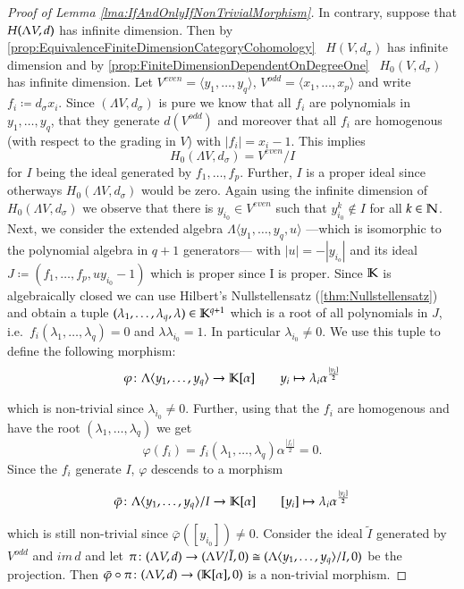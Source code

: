 \begin{proof}[Proof of Lemma \ref{lma:IfAndOnlyIfNonTrivialMorphism}]
  In contrary, suppose that $H(\Lambda V,d)$ has infinite dimension. Then by \ref{prop:EquivalenceFiniteDimensionCategoryCohomology}
  ~$H(V, d_{\sigma})$ has infinite dimension and by \ref{prop:FiniteDimensionDependentOnDegreeOne} ~$H_0(V, d_{\sigma})$ has
  infinite dimension. Let ${V^{even} = \langle y_1, \ldots , y_q \rangle}$,
  ${V^{odd} = \langle x_1 , \ldots , x_p \rangle}$ and write
  $f_i \coloneqq d_{\sigma} x_i$. Since $(\Lambda V, d_{\sigma})$ is pure we know that all $f_i$ are 
  polynomials in $y_1, \ldots , y_q$, that they generate $d(V^{odd})$ and moreover that all $f_i$ are homogenous (with
  respect to the grading in $V$)
  with $|f_i| = x_i -1$. This implies 
  $$H_0(\Lambda V,d_{\sigma}) = V^{even} / I$$
  for $I$ being the ideal generated by $f_1, \ldots, f_p$. Further, $I$  is a proper ideal since otherways
  $H_0(\Lambda V,d_{\sigma})$ would be zero. Again using the infinite dimension of 
  $H_0(\Lambda V,d_{\sigma})$ we observe that there is $y_{i_0} \in V^{even}$  such that
  $y_{i_0}^k \notin I$ for all $k \in \mathbb{N}$. Next, we consider the extended algebra 
  $\Lambda \langle y_1, \ldots, y_q, u \rangle$ ---which is isomorphic to the polynomial algebra in $q+1$ generators---
  with $|u| = - |y_{i_o}|$ and its ideal 
  $J \coloneqq (f_1, \ldots, f_p, u y_{i_0} - 1)$ which is proper since I is proper.
  Since $\mathbb{K}$ is algebraically closed we can use Hilbert's Nullstellensatz (\ref{thm:Nullstellensatz}) and obtain a tuple 
  $(\lambda_1, \ldots, \lambda_q, \lambda) \in \mathbb{K}^{q+1}$ which is a root of all polynomials in $J$,
  i.e.\ $f_i(\lambda_1, \ldots, \lambda_q) = 0$ and $\lambda \lambda_{i_0} = 1$. In particular 
  $\lambda_{i_0} \neq 0$. We use this tuple to define the following morphism:
  $$ \varphi \colon  \Lambda \langle y_1, \ldots, y_q \rangle \to \mathbb{K}[\alpha]
  \qquad y_i \mapsto \lambda_i \alpha^{\frac{|y_i]}{2}}$$
  
  which is non-trivial since $\lambda_{i_0} \neq 0$. Further, using that the $f_i$ are homogenous 
  and have the root $(\lambda_1, \ldots , \lambda_q)$ we get 
  $$\varphi(f_i) = f_i(\lambda_1, \ldots , \lambda_q) \alpha^{\frac{|f_i|}{2}} = 0. $$
  Since the $f_i$ generate $I$,  $\varphi$ descends to a morphism
  
  $$ \bar{\varphi} \colon  \Lambda \langle y_1, \ldots, y_q \rangle/I \to \mathbb{K}[\alpha]
   \qquad [y_i] \mapsto \lambda_i \alpha^{\frac{|y_i]}{2}}$$
  
  which is still non-trivial since $\bar{\varphi} ( [y_{i_0}]) \neq 0$.
  Consider the ideal $\tilde{I}$ generated by 
  $V^{odd}$ and $im \, d$ and let $\pi \colon (\Lambda V,d) \to (\Lambda V / \tilde{I} , 0) 
  \cong (\Lambda \langle y_1, \ldots, y_q \rangle/I,0)$ be the projection. Then 
  ${ \bar{\varphi} \circ \pi \colon (\Lambda V,d) \to (\mathbb{K}[\alpha], 0)}$ is a non-trivial morphism.
 \end{proof}
 
